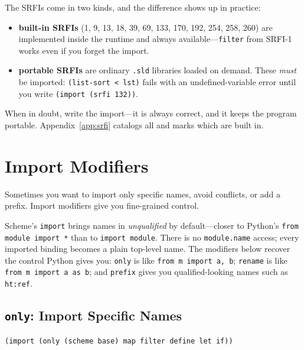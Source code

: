 The \srfitotal{} SRFIs come in two kinds, and the difference shows up in practice:

\begin{itemize}
    \item \textbf{\srfibuiltin{} built-in SRFIs} (1, 9, 13, 18, 39, 69, 133, 170, 192, 254, 258, 260) are implemented inside the runtime and always available---\texttt{filter} from SRFI-1 works even if you forget the import.
    \item \textbf{\srfiportable{} portable SRFIs} are ordinary \texttt{.sld} libraries loaded on demand. These \emph{must} be imported: \texttt{(list-sort < lst)} fails with an undefined-variable error until you write \texttt{(import (srfi 132))}.
\end{itemize}

When in doubt, write the import---it is always correct, and it keeps the program portable. Appendix~\ref{app:srfi} catalogs all \srfitotal{} and marks which are built in.

\section{Import Modifiers}

Sometimes you want to import only specific names, avoid conflicts, or add a prefix. Import modifiers give you fine-grained control.

\begin{note}
Scheme's \texttt{import} brings names in \emph{unqualified} by default---closer to Python's \texttt{from module import *} than to \texttt{import module}. There is no \texttt{module.name} access; every imported binding becomes a plain top-level name. The modifiers below recover the control Python gives you: \texttt{only} is like \texttt{from m import a, b}; \texttt{rename} is like \texttt{from m import a as b}; and \texttt{prefix} gives you qualified-looking names such as \texttt{ht:ref}.
\end{note}

\subsection{\texttt{only}: Import Specific Names}

\begin{lstlisting}
(import (only (scheme base) map filter define let if))
\end{lstlisting}

